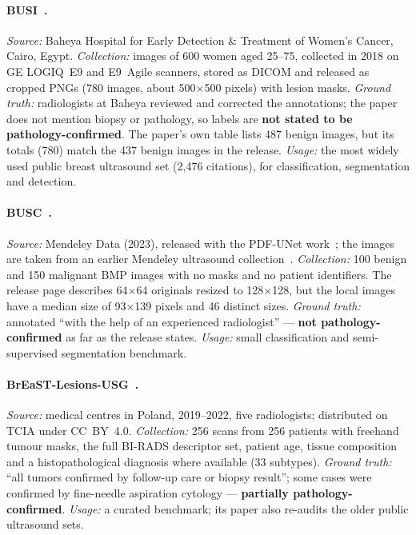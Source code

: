 \documentclass[11pt]{article}
\begin{document}
\paragraph{BUSI~\citep{aldhabyani2020busi}.}
\emph{Source:} Baheya Hospital for Early Detection \& Treatment of Women's
Cancer, Cairo, Egypt. \emph{Collection:} images of 600 women aged 25--75,
collected in 2018 on GE LOGIQ~E9 and E9~Agile scanners, stored as DICOM and
released as cropped PNGs (780 images, about 500$\times$500 pixels) with
lesion masks. \emph{Ground truth:} radiologists at Baheya reviewed and
corrected the annotations; the paper does not mention biopsy or pathology,
so labels are \textbf{not stated to be pathology-confirmed}. The paper's own
table lists 487 benign images, but its totals (780) match the 437 benign
images in the release. \emph{Usage:} the most widely used public breast
ultrasound set (2,476 citations), for classification, segmentation and
detection.

\paragraph{BUSC~\citep{busc2023mendeley}.}
\emph{Source:} Mendeley Data (2023), released with the PDF-UNet
work~\citep{iqbalsharif2023pdfunet}; the images are taken from an earlier
Mendeley ultrasound collection~\citep{rodrigues2017bus}. \emph{Collection:}
100 benign and 150 malignant BMP images with no masks and no patient
identifiers. The release page describes 64$\times$64 originals resized to
128$\times$128, but the local images have a median size of 93$\times$139
pixels and 46 distinct sizes. \emph{Ground truth:} annotated ``with the help
of an experienced radiologist'' --- \textbf{not pathology-confirmed} as far
as the release states. \emph{Usage:} small classification and semi-supervised
segmentation benchmark.

\paragraph{BrEaST-Lesions-USG~\citep{pawlowska2024breast}.}
\emph{Source:} medical centres in Poland, 2019--2022, five radiologists;
distributed on TCIA under CC~BY~4.0. \emph{Collection:} 256 scans from 256
patients with freehand tumour masks, the full BI-RADS descriptor set, patient
age, tissue composition and a histopathological diagnosis where available
(33 subtypes). \emph{Ground truth:} ``all tumors confirmed by follow-up care
or biopsy result''; some cases were confirmed by fine-needle aspiration
cytology --- \textbf{partially pathology-confirmed}. \emph{Usage:} a curated
benchmark; its paper also re-audits the older public ultrasound sets.
\end{document}
